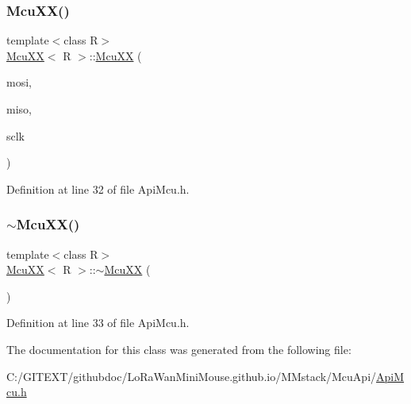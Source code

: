 \subsubsection{\texorpdfstring{Mcu\+X\+X()}{McuXX()}}
{\footnotesize\ttfamily template$<$class R$>$ \\
\mbox{\hyperlink{class_mcu_x_x}{Mcu\+XX}}$<$ R $>$\+::\mbox{\hyperlink{class_mcu_x_x}{Mcu\+XX}} (\begin{DoxyParamCaption}\item[{\mbox{\hyperlink{_class_s_t_m32_l0_8h_a5ceb873075d76667eb54dc6a7d2734d1}{Pin\+Name}}}]{mosi,  }\item[{\mbox{\hyperlink{_class_s_t_m32_l0_8h_a5ceb873075d76667eb54dc6a7d2734d1}{Pin\+Name}}}]{miso,  }\item[{\mbox{\hyperlink{_class_s_t_m32_l0_8h_a5ceb873075d76667eb54dc6a7d2734d1}{Pin\+Name}}}]{sclk }\end{DoxyParamCaption})\hspace{0.3cm}{\ttfamily [inline]}}



Definition at line 32 of file Api\+Mcu.\+h.

\mbox{\label{class_mcu_x_x_aabd5bdc5db9e38ff12f72d196eb11b8d}} 
\subsubsection{\texorpdfstring{$\sim$\+Mcu\+X\+X()}{~McuXX()}}
{\footnotesize\ttfamily template$<$class R$>$ \\
\mbox{\hyperlink{class_mcu_x_x}{Mcu\+XX}}$<$ R $>$\+::$\sim$\mbox{\hyperlink{class_mcu_x_x}{Mcu\+XX}} (\begin{DoxyParamCaption}{ }\end{DoxyParamCaption})\hspace{0.3cm}{\ttfamily [inline]}}



Definition at line 33 of file Api\+Mcu.\+h.



The documentation for this class was generated from the following file\+:\begin{DoxyCompactItemize}
\item 
C\+:/\+G\+I\+T\+E\+X\+T/githubdoc/\+Lo\+Ra\+Wan\+Mini\+Mouse.\+github.\+io/\+M\+Mstack/\+Mcu\+Api/\mbox{\hyperlink{_api_mcu_8h}{Api\+Mcu.\+h}}\end{DoxyCompactItemize}
